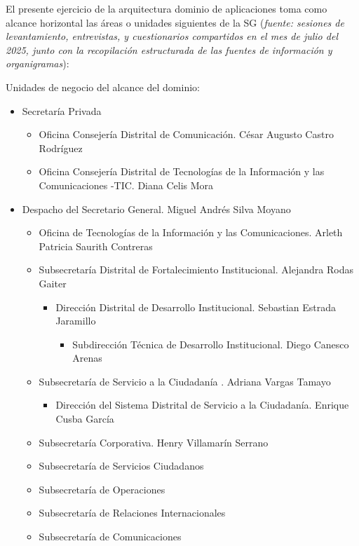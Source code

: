 \documentclass[
	a4paper, %
	12pt, %
]{include/CSSullivanBusinessReport}
\def\tightlist{}
\begin{document}
El presente ejercicio de la arquitectura dominio de aplicaciones toma
como alcance horizontal las áreas o unidades siguientes de la SG
(\emph{fuente: sesiones de levantamiento, entrevistas, y cuestionarios
compartidos en el mes de julio del 2025, junto con la recopilación
estructurada de las fuentes de información y organigramas}):

Unidades de negocio del alcance del dominio:

\begin{itemize}
\tightlist
\item
  Secretaría Privada

  \begin{itemize}
  \tightlist
  \item
    Oficina Consejería Distrital de Comunicación. César Augusto Castro
    Rodríguez
  \item
    Oficina Consejería Distrital de Tecnologías de la Información y las
    Comunicaciones -TIC. Diana Celis Mora
  \end{itemize}
\item
  Despacho del Secretario General. Miguel Andrés Silva Moyano

  \begin{itemize}
  \tightlist
  \item
    Oficina de Tecnologías de la Información y las Comunicaciones.
    Arleth Patricia Saurith Contreras
  \item
    Subsecretaría Distrital de Fortalecimiento Institucional. Alejandra
    Rodas Gaiter

    \begin{itemize}
    \tightlist
    \item
      Dirección Distrital de Desarrollo Institucional. Sebastian Estrada
      Jaramillo

      \begin{itemize}
      \tightlist
      \item
        Subdirección Técnica de Desarrollo Institucional. Diego Canesco
        Arenas
      \end{itemize}
    \end{itemize}
  \item
    Subsecretaría de Servicio a la Ciudadanía . Adriana Vargas Tamayo

    \begin{itemize}
    \tightlist
    \item
      Dirección del Sistema Distrital de Servicio a la Ciudadanía.
      Enrique Cusba García
    \end{itemize}
  \item
    Subsecretaría Corporativa. Henry Villamarín Serrano
  \item
    Subsecretaría de Servicios Ciudadanos
  \item
    Subsecretaría de Operaciones
  \item
    Subsecretaría de Relaciones Internacionales
  \item
    Subsecretaría de Comunicaciones
  \end{itemize}
\end{itemize}
\end{document}
